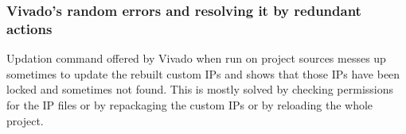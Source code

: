 \subsubsection{Vivado's random errors and resolving it by redundant actions}
Updation command offered by Vivado when run on project sources messes up sometimes to update the rebuilt custom IPs and shows that those IPs
have been locked and sometimes not found. This is mostly solved by checking permissions for the IP files or by repackaging the custom IPs or
by reloading the whole project.
